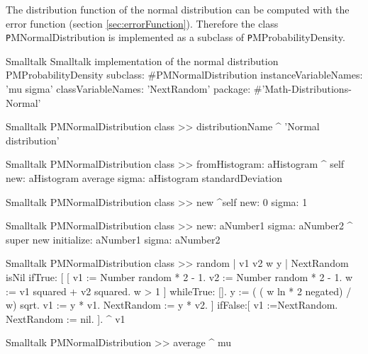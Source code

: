 The distribution function of the normal distribution can be
computed with the error function (\cf section
\ref{sec:errorFunction}). Therefore the class {\texttt
PMNormalDistribution} is implemented as a subclass of {\texttt
PMProbabilityDensity}.

%
\begin{listing}[label=lst:normdist]{Smalltalk}
{Smalltalk implementation of the normal distribution}
PMProbabilityDensity subclass: #PMNormalDistribution
   instanceVariableNames: 'mu sigma'
    classVariableNames: 'NextRandom'
    package: #'Math-Distributions-Normal'
\end{listing}

\begin{displaycode}{Smalltalk}
PMNormalDistribution class >> distributionName
    ^ 'Normal distribution'
\end{displaycode}

\begin{displaycode}{Smalltalk}
PMNormalDistribution class >> fromHistogram: aHistogram
    ^ self new: aHistogram average sigma: aHistogram standardDeviation
\end{displaycode}

\begin{displaycode}{Smalltalk}
PMNormalDistribution class >> new
    ^self new: 0 sigma: 1
\end{displaycode}

\begin{displaycode}{Smalltalk}
PMNormalDistribution class >> new: aNumber1 sigma: aNumber2
    ^ super new initialize: aNumber1 sigma: aNumber2
\end{displaycode}

\begin{displaycode}{Smalltalk}
PMNormalDistribution class >> random
    | v1 v2 w y |
    NextRandom isNil
        ifTrue: [ [ v1 := Number random * 2 - 1.
                    v2 := Number random * 2 - 1.
                    w := v1 squared + v2 squared.
                    w > 1 ] whileTrue: [].
                  y := ( ( w ln * 2 negated) / w) sqrt.
                v1 := y * v1.
                NextRandom := y * v2.
                ]
        ifFalse:[ v1 :=NextRandom.
                  NextRandom := nil.
                ].
    ^ v1
\end{displaycode}

\begin{displaycode}{Smalltalk}
PMNormalDistribution >> average
    ^ mu
\end{displaycode}

